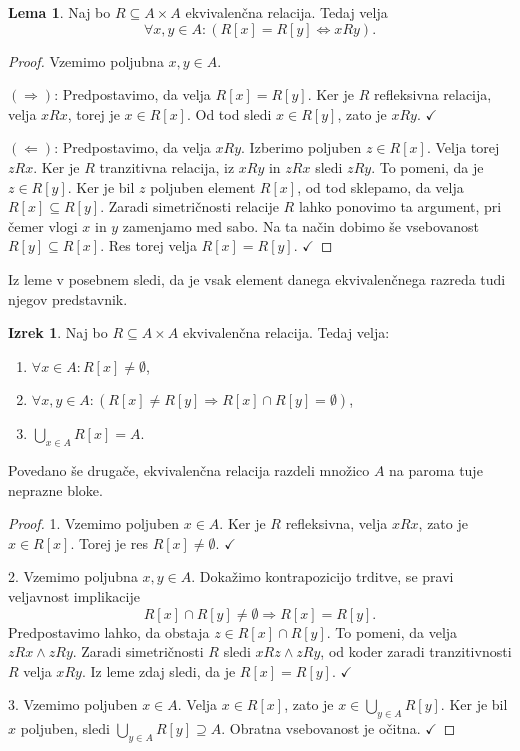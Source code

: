 \documentclass[11pt]{book}
\def\kljuka{$\checkmark$}
\theoremstyle{definition}
\theoremstyle{zgled}
\theoremstyle{odprtproblem}
\theoremstyle{domacanaloga}
\newenvironment{dokaz}
    {\color{siva}\begin{proof}}
    {\end{proof}}
\theoremstyle{izrek}
\newtheorem*{izrek}{Izrek}
\newtheorem*{lema}{Lema}
\begin{document}
\begin{lema}
Naj bo $R \subseteq A \times A$ ekvivalenčna relacija. Tedaj velja
\[
    \forall x,y \in A \colon (R[x] = R[y] \Leftrightarrow xRy).
\]
\end{lema}
\begin{dokaz}
Vzemimo poljubna $x,y \in A$.

$(\Rightarrow)$: Predpostavimo, da velja $R[x] = R[y]$. Ker je $R$ refleksivna relacija, velja $xRx$, torej je $x \in R[x]$. Od tod sledi $x \in R[y]$, zato je $xRy$. \kljuka

$(\Leftarrow)$: Predpostavimo, da velja $xRy$. Izberimo poljuben $z \in R[x]$. Velja torej $zRx$. Ker je $R$ tranzitivna relacija, iz $xRy$ in $zRx$ sledi $zRy$. To pomeni, da je $z \in R[y]$. Ker je bil $z$ poljuben element $R[x]$, od tod sklepamo, da velja $R[x] \subseteq R[y]$. Zaradi simetričnosti relacije $R$ lahko ponovimo ta argument, pri čemer vlogi $x$ in $y$ zamenjamo med sabo. Na ta način dobimo še vsebovanost $R[y] \subseteq R[x]$. Res torej velja $R[x] = R[y]$. \kljuka
\end{dokaz}

Iz leme v posebnem sledi, da je vsak element danega ekvivalenčnega razreda tudi njegov predstavnik.

\begin{izrek}
Naj bo $R \subseteq A \times A$ ekvivalenčna relacija. Tedaj velja:
\begin{enumerate}
    \item $\forall x \in A \colon R[x] \neq \emptyset$,
    \item $\forall x, y \in A \colon (R[x] \neq R[y] \Rightarrow R[x] \cap R[y] = \emptyset)$,
    \item $\bigcup_{x \in A} R[x] = A$.
\end{enumerate}
\end{izrek}

Povedano še drugače, ekvivalenčna relacija razdeli množico $A$ na paroma tuje neprazne bloke.

\begin{dokaz}
1. Vzemimo poljuben $x \in A$. Ker je $R$ refleksivna, velja $x R x$, zato je $x \in R[x]$. Torej je res $R[x] \neq \emptyset$. \kljuka

2. Vzemimo poljubna $x,y \in A$. Dokažimo kontrapozicijo trditve, se pravi veljavnost implikacije 
\[
    R[x]\cap R[y] \neq \emptyset \Rightarrow R[x] = R[y].
\]
Predpostavimo lahko, da obstaja $z \in R[x] \cap R[y]$. To pomeni, da velja $zRx \land zRy$. Zaradi simetričnosti $R$ sledi $xRz \land zRy$, od koder zaradi tranzitivnosti $R$ velja $xRy$. Iz leme zdaj sledi, da je $R[x] = R[y]$. \kljuka

3. Vzemimo poljuben $x \in A$. Velja $x \in R[x]$, zato je $x \in \bigcup_{y \in A} R[y]$. Ker je bil $x$ poljuben, sledi $\bigcup_{y \in A} R[y] \supseteq A$. Obratna vsebovanost je očitna. \kljuka
\end{dokaz}
\end{document}
